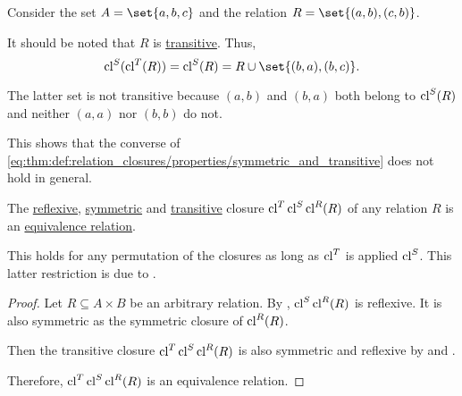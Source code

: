 \begin{example}\label{ex:thm:def:relation_closures/properties/symmetric_and_transitive}
  Consider the set \( A = \set{ a, b, c } \) and the relation \( R = \set{ (a, b), (c, b) } \).

  It should be noted that \( R \) is \hyperref[def:binary_relation/transitive]{transitive}. Thus,
  \begin{equation*}
    \cl^S(\cl^T(R)) = \cl^S(R) = R \cup \set{ (b, a), (b, c) }.
  \end{equation*}

  The latter set is not transitive because \( (a, b) \) and \( (b, a) \) both belong to \( \operatorname{cl}^S(R) \) and neither \( (a, a) \) nor \( (b, b) \) do not.

  This shows that the converse of \eqref{eq:thm:def:relation_closures/properties/symmetric_and_transitive} does not hold in general.
\end{example}

\begin{proposition}\label{thm:equivalence_closure}
  The \hyperref[def:relation_closures/reflexive]{reflexive}, \hyperref[def:relation_closures/symmetric]{symmetric} and \hyperref[def:relation_closures/transitive]{transitive} closure \( \operatorname{cl}^T \operatorname{cl}^S \operatorname{cl}^R (R) \) of any relation \( R \) is an \hyperref[def:equivalence_relation]{equivalence relation}.

  This holds for any permutation of the closures as long as \( \operatorname{cl}^T \) is applied  \( \operatorname{cl}^S \). This latter restriction is due to .
\end{proposition}
\begin{proof}
  Let \( R \subseteq A \times B \) be an arbitrary relation. By , \( \operatorname{cl}^S \operatorname{cl}^R (R) \) is reflexive. It is also symmetric as the symmetric closure of \( \operatorname{cl}^R(R) \).

  Then the transitive closure \( \operatorname{cl}^T \operatorname{cl}^S \operatorname{cl}^R (R) \) is also symmetric and reflexive by  and .

  Therefore, \( \operatorname{cl}^T \operatorname{cl}^S \operatorname{cl}^R (R) \) is an equivalence relation.
\end{proof}
